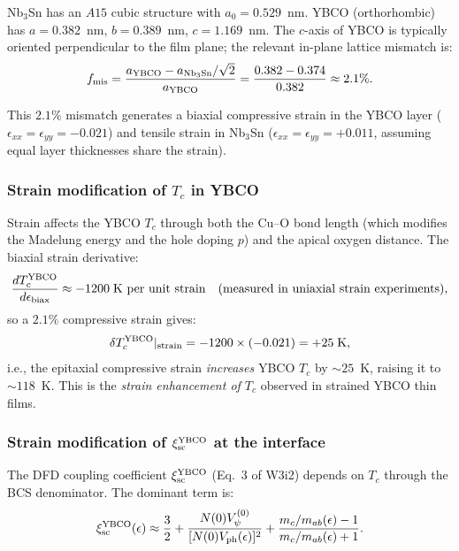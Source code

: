 \documentclass[11pt]{article}
\begin{document}
Nb$_3$Sn has an $A15$ cubic structure with $a_0 = 0.529$~nm.
YBCO (orthorhombic) has $a = 0.382$~nm, $b = 0.389$~nm, $c = 1.169$~nm.
The $c$-axis of YBCO is typically oriented perpendicular to the film plane;
the relevant in-plane lattice mismatch is:
\begin{equation}
f_{\rm mis} = \frac{a_{\rm YBCO} - a_{\rm Nb_3Sn}/\sqrt{2}}{a_{\rm YBCO}}
= \frac{0.382 - 0.374}{0.382} \approx 2.1\%.
\label{eq:mismatch}
\end{equation}

This $2.1\%$ mismatch generates a biaxial compressive strain in the YBCO
layer ($\epsilon_{xx} = \epsilon_{yy} = -0.021$) and tensile strain in
Nb$_3$Sn ($\epsilon_{xx} = \epsilon_{yy} = +0.011$, assuming equal layer
thicknesses share the strain).

\subsubsection{Strain modification of $T_c$ in YBCO}

Strain affects the YBCO $T_c$ through both the Cu--O bond length (which
modifies the Madelung energy and the hole doping $p$) and the apical oxygen
distance. The biaxial strain derivative:
\begin{equation}
\frac{dT_c^{\rm YBCO}}{d\epsilon_{\rm biax}}
\approx -1200\;\text{K per unit strain}
\quad\text{(measured in uniaxial strain experiments)},
\label{eq:dTc-dstrain}
\end{equation}
so a $2.1\%$ compressive strain gives:
\begin{equation}
\delta T_c^{\rm YBCO}|_{\rm strain}
= -1200 \times (-0.021) = +25\;\text{K},
\label{eq:dTc-YBCO-strain}
\end{equation}
i.e., the epitaxial compressive strain \emph{increases} YBCO $T_c$ by
$\sim 25$~K, raising it to $\sim 118$~K. This is the \emph{strain
enhancement of $T_c$} observed in strained YBCO thin films.

\subsubsection{Strain modification of $\xi_{\rm sc}^{\rm YBCO}$ at the interface}

The DFD coupling coefficient $\xi_{\rm sc}^{\rm YBCO}$ (Eq.~3 of W3i2)
depends on $T_c$ through the BCS denominator. The dominant term is:
\begin{equation}
\xi_{\rm sc}^{\rm YBCO}(\epsilon) \approx
\frac{3}{2} + \frac{N(0)V_\psi^{(0)}}{[N(0)V_{\rm ph}(\epsilon)]^2}
+ \frac{m_c/m_{ab}(\epsilon) - 1}{m_c/m_{ab}(\epsilon) + 1}.
\label{eq:xi-YBCO-strain}
\end{equation}
\end{document}
